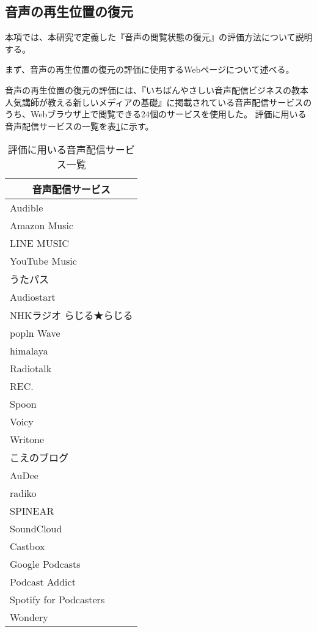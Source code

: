 \subsection{音声の再生位置の復元}
本項では、本研究で定義した『音声の閲覧状態の復元』の評価方法について説明する。

まず、音声の再生位置の復元の評価に使用するWebページについて述べる。

音声の再生位置の復元の評価には、『いちばんやさしい音声配信ビジネスの教本 人気講師が教える新しいメディアの基礎』\cite{easiest-audio-buisiness-book}に掲載されている音声配信サービスのうち、Webブラウザ上で閲覧できる24個のサービスを使用した。
評価に用いる音声配信サービスの一覧を表\ref{tb:evl-audio-service-list}に示す。

\begin{table}[htbp]
  \label{tb:evl-audio-service-list}
  \caption{評価に用いる音声配信サービス一覧}
  \begin{center}
    \begin{tabular}{|l|}
    \hline
    \multicolumn{1}{|c|}{\textbf{音声配信サービス}} \\\hline
    Audible \\ \hline
    Amazon Music \\ \hline
    LINE MUSIC \\ \hline
    YouTube Music \\ \hline
    うたパス \\ \hline
    Audiostart \\ \hline
    NHKラジオ らじる★らじる \\ \hline
    popln Wave \\ \hline
    himalaya \\ \hline
    Radiotalk \\ \hline
    REC. \\ \hline
    Spoon \\ \hline
    Voicy \\ \hline
    Writone \\ \hline
    こえのブログ \\ \hline
    AuDee \\ \hline
    radiko \\ \hline
    SPINEAR \\ \hline
    SoundCloud \\ \hline
    Castbox \\ \hline
    Google Podcasts \\ \hline
    Podcast Addict \\ \hline
    Spotify for Podcasters \\ \hline
    Wondery \\ \hline
    \end{tabular}
  \end{center}
\end{table}

